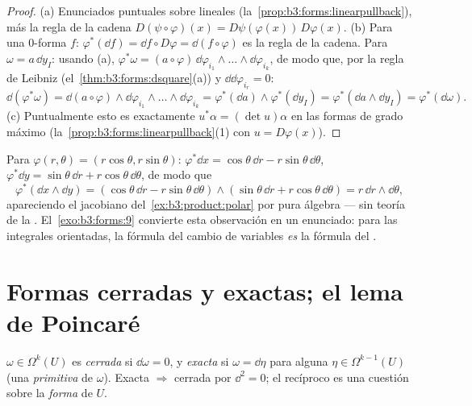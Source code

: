 \begin{proof}
(a) Enunciados puntuales sobre
 lineales
(la~\cref{prop:b3:forms:linearpullback}), más la regla de la cadena
$D(\psi\circ\varphi)(x) = D\psi(\varphi(x))\,D\varphi(x)$.
(b) Para una $0$-forma $f$: $\varphi^*(\dd f) = \dd f \circ
D\varphi = \dd(f \circ \varphi)$ es la regla de la cadena. Para
$\omega = a\,\dd y_I$: usando (a), $\varphi^*\omega =
(a\circ\varphi)\,\dd\varphi_{i_1}\wedge\dots\wedge
\dd\varphi_{i_k}$, de modo que, por la regla de Leibniz
(el~\cref{thm:b3:forms:dsquare}(a)) y $\dd\dd\varphi_{i_r} =
0$:
\[
\dd(\varphi^*\omega) = \dd(a\circ\varphi) \wedge
\dd\varphi_{i_1}\wedge\dots\wedge\dd\varphi_{i_k}
= \varphi^*(\dd a) \wedge \varphi^*(\dd y_I)
= \varphi^*(\dd a \wedge \dd y_I) =
\varphi^*(\dd\omega).
\]
(c) Puntualmente esto es exactamente $u^*\alpha = (\det u)\alpha$ en las
formas de grado máximo (la~\cref{prop:b3:forms:linearpullback}(1) con
$u = D\varphi(x)$).
\end{proof}

\begin{example}\label{ex:b3:forms:polar}
Para $\varphi(r, \theta) = (r\cos\theta, r\sin\theta)$:
$\varphi^*\dd x = \cos\theta\,\dd r -
r\sin\theta\,\dd\theta$, $\varphi^*\dd y = \sin\theta\,\dd r
+ r\cos\theta\,\dd\theta$, de modo que
\[
\varphi^*(\dd x \wedge \dd y) =
(\cos\theta\,\dd r - r\sin\theta\,\dd\theta) \wedge
(\sin\theta\,\dd r + r\cos\theta\,\dd\theta)
= r\,\dd r \wedge \dd\theta,
\]
apareciendo el jacobiano del~\cref{ex:b3:product:polar} por pura álgebra
--- sin teoría de la .
El~\cref{exo:b3:forms:9} convierte esta observación en un enunciado:
para las integrales orientadas, la fórmula del cambio de variables
\emph{es} la fórmula del .
\end{example}

\section{Formas cerradas y exactas; el lema de Poincaré}

\begin{definition}\label{def:b3:forms:closedexact}
$\omega \in \Omega^k(U)$ es \emph{cerrada} si
$\dd\omega = 0$, y \emph{exacta} si
$\omega = \dd\eta$ para alguna $\eta \in \Omega^{k-1}(U)$ (una
\emph{primitiva} de $\omega$). Exacta $\Rightarrow$ cerrada por
$\dd^2 = 0$; el recíproco es una cuestión sobre la \emph{forma} de $U$.
\end{definition}

